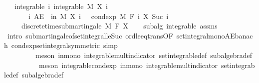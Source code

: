 \begin{isabellebody}
\ \ \ integrable{\isacharcolon}{\kern0pt}\ {\isachardoublequoteopen}{\isasymAnd}i{\isachardot}{\kern0pt}\ integrable\ M\ {\isacharparenleft}{\kern0pt}X\ i{\isacharparenright}{\kern0pt}{\isachardoublequoteclose}\ \isanewline
\ \ \ \ \ \ \ {\isachardoublequoteopen}{\isasymAnd}i{\isachardot}{\kern0pt}\ AE\ {\isasymxi}\ in\ M{\isachardot}{\kern0pt}\ X\ i\ {\isasymxi}\ {\isasymle}\ cond{\isacharunderscore}{\kern0pt}exp\ M\ {\isacharparenleft}{\kern0pt}F\ i{\isacharparenright}{\kern0pt}\ {\isacharparenleft}{\kern0pt}X\ {\isacharparenleft}{\kern0pt}Suc\ i{\isacharparenright}{\kern0pt}{\isacharparenright}{\kern0pt}\ {\isasymxi}{\isachardoublequoteclose}\ \isanewline
\ \ \ \ \ {\isachardoublequoteopen}discrete{\isacharunderscore}{\kern0pt}time{\isacharunderscore}{\kern0pt}submartingale\ M\ F\ X{\isachardoublequoteclose}\isanewline
%
\isadelimproof
\ \ %
\endisadelimproof
%
\isatagproof
{}\isamarkupfalse%
\ subalg\ integrable\ assms{\isacharparenleft}{\kern0pt}{}{\isacharparenright}{\kern0pt}\isanewline
\ \ \isamarkupfalse%
\ {\isacharparenleft}{\kern0pt}intro\ submartingale{\isacharunderscore}{\kern0pt}of{\isacharunderscore}{\kern0pt}set{\isacharunderscore}{\kern0pt}integral{\isacharunderscore}{\kern0pt}le{\isacharunderscore}{\kern0pt}Suc\ ord{\isacharunderscore}{\kern0pt}le{\isacharunderscore}{\kern0pt}eq{\isacharunderscore}{\kern0pt}trans{\isacharbrackleft}{\kern0pt}OF\ set{\isacharunderscore}{\kern0pt}integral{\isacharunderscore}{\kern0pt}mono{\isacharunderscore}{\kern0pt}AE{\isacharunderscore}{\kern0pt}banach\ cond{\isacharunderscore}{\kern0pt}exp{\isacharunderscore}{\kern0pt}set{\isacharunderscore}{\kern0pt}integral{\isacharbrackleft}{\kern0pt}symmetric{\isacharbrackright}{\kern0pt}{\isacharbrackright}{\kern0pt}{\isacharcomma}{\kern0pt}\ simp{\isacharparenright}{\kern0pt}\isanewline
\ \ \ \ \ \ \ \ \ {\isacharparenleft}{\kern0pt}meson\ in{\isacharunderscore}{\kern0pt}mono\ integrable{\isacharunderscore}{\kern0pt}mult{\isacharunderscore}{\kern0pt}indicator\ set{\isacharunderscore}{\kern0pt}integrable{\isacharunderscore}{\kern0pt}def\ subalgebra{\isacharunderscore}{\kern0pt}def{\isacharcomma}{\kern0pt}\isanewline
\ \ \ \ \ \ \ \ \ \ meson\ integrable{\isacharunderscore}{\kern0pt}cond{\isacharunderscore}{\kern0pt}exp\ in{\isacharunderscore}{\kern0pt}mono\ integrable{\isacharunderscore}{\kern0pt}mult{\isacharunderscore}{\kern0pt}indicator\ set{\isacharunderscore}{\kern0pt}integrable{\isacharunderscore}{\kern0pt}def\ subalgebra{\isacharunderscore}{\kern0pt}def{\isacharcomma}{\kern0pt}\isanewline

\end{isabellebody}
